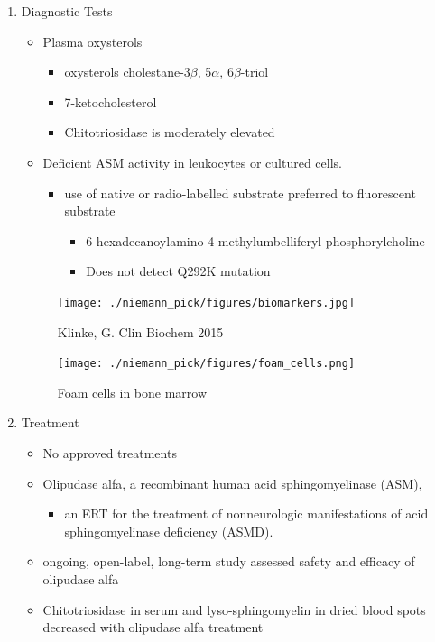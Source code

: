 \documentclass{scrartcl}
\begin{document}
\begin{enumerate}
\item Diagnostic Tests
\label{sec:org608ca0c}
\begin{itemize}
\item Plasma oxysterols
\begin{itemize}
\item oxysterols cholestane-3\(\beta\), 5\(\alpha\), 6\(\beta\)-triol
\item 7-ketocholesterol
\item Chitotriosidase is moderately elevated
\end{itemize}
\item Deficient ASM activity in leukocytes or cultured cells.
\begin{itemize}
\item use of native or radio-labelled substrate preferred to fluorescent substrate
\begin{itemize}
\item 6-hexadecanoylamino-4-methylumbelliferyl-phosphorylcholine
\item Does not detect Q292K mutation
\end{itemize}
\end{itemize}
\end{itemize}

\begin{figure}[htbp]
\centering
\texttt{[image: ./niemann\_pick/figures/biomarkers.jpg]}
\caption{\label{fig:org72e4448}
Klinke, G. Clin Biochem 2015}
\end{figure}

\begin{figure}[htbp]
\centering
\texttt{[image: ./niemann\_pick/figures/foam\_cells.png]}
\caption{\label{fig:orgd4b24e4}
Foam cells in bone marrow}
\end{figure}

\item Treatment
\label{sec:org26ae890}
\begin{itemize}
\item No approved treatments
\item Olipudase alfa, a recombinant human acid sphingomyelinase (ASM),
\begin{itemize}
\item an ERT for the treatment of nonneurologic manifestations of acid sphingomyelinase deficiency (ASMD).
\end{itemize}
\item ongoing, open-label, long-term study assessed safety and efficacy of olipudase alfa
\item Chitotriosidase in serum and lyso-sphingomyelin in dried blood spots
decreased with olipudase alfa treatment
\end{itemize}
\end{enumerate}
\end{document}
